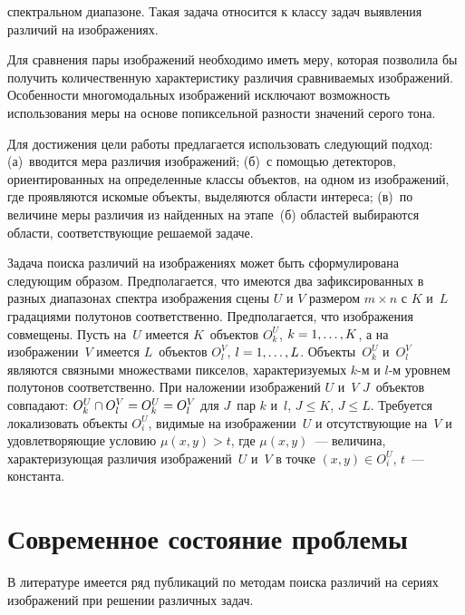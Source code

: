 \begin{multicols}{2}
\addtocounter{figure}{1}


\noindent
 спектральном диапазоне. Такая 
задача относится к классу задач выявления различий на изображениях.
  
  Для сравнения пары изображений необходимо иметь меру, которая позволила бы 
получить количественную характеристику различия сравниваемых изображений. 
Особенности многомодальных изоб\-ра\-же\-ний исключают возможность использования меры 
на основе попиксельной разности значений серого тона.
  
  Для достижения цели работы предлагается использовать следующий подход: 
(а)~вводится мера различия изображений; (б)~с помощью детекторов, 
ориентированных на определенные классы объектов, на одном из изображений, где 
проявляются искомые объекты, выделяются области интереса; (в)~по величине меры 
различия из найденных на этапе~(б) областей выбираются области, соответствующие 
решаемой задаче.
  
  Задача поиска различий на изображениях может быть сформулирована следующим 
образом. Предполагается, что имеются два зафиксированных в разных диапазонах спектра 
изображения сцены $U$ и $V$ размером $m\times n$ с $K$ и~$L$ градациями полутонов 
соответственно. Предполагается, что изображения совмещены. Пусть на~$U$ имеется 
$K$~объектов $O^U_k$,  $k \hm= 1, \ldots , K$, а на изображении~$V$ имеется $L$~объектов 
$O_l^V$, $l\hm = 1, \ldots , L$. Объекты~$O_k^U$ и~$O_l^V$ являются связными 
множествами пикселов, характеризуемых $k$-м и $l$-м уровнем полутонов соответственно. 
При наложении изображений $U$ и~$V$ $J$~объектов совпадают: $O_k^U\cap 
O_l^V\hm=O_k^U\hm =O_l^V$ для $J$~пар $k$ и~$l$, $J\leq K$, $J\leq L$. Требуется 
локализовать объекты $O_i^U$, видимые на изображении~$U$ и от\-сут\-ст\-ву\-ющие на~$V$ и 
удовлетворяющие условию $\mu(x,y)>t$, где $\mu(x,y)$~--- величина, характеризующая 
различия изображений~$U$ и~$V$ в точке $(x,y)\in O_i^U$, $t$~--- константа.


\section{Современное состояние проблемы}


  В литературе имеется ряд публикаций по методам поиска различий на сериях 
изображений при решении различных задач. 


\end{multicols}
